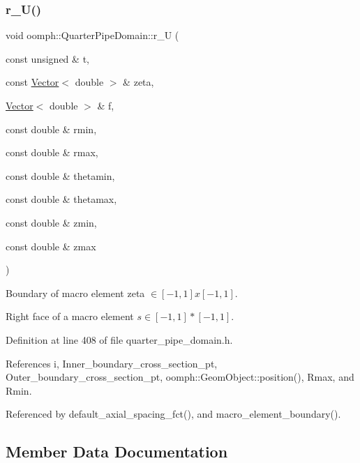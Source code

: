 \subsubsection{\texorpdfstring{r\+\_\+\+U()}{r\_U()}}
{\footnotesize\ttfamily void oomph\+::\+Quarter\+Pipe\+Domain\+::r\+\_\+U (\begin{DoxyParamCaption}\item[{const unsigned \&}]{t,  }\item[{const \hyperlink{classoomph_1_1Vector}{Vector}$<$ double $>$ \&}]{zeta,  }\item[{\hyperlink{classoomph_1_1Vector}{Vector}$<$ double $>$ \&}]{f,  }\item[{const double \&}]{rmin,  }\item[{const double \&}]{rmax,  }\item[{const double \&}]{thetamin,  }\item[{const double \&}]{thetamax,  }\item[{const double \&}]{zmin,  }\item[{const double \&}]{zmax }\end{DoxyParamCaption})\hspace{0.3cm}{\ttfamily [private]}}



Boundary of macro element zeta $ \in [-1,1]x[-1,1] $. 

Right face of a macro element $ s \in [-1,1]*[-1,1] $. 

Definition at line 408 of file quarter\+\_\+pipe\+\_\+domain.\+h.



References i, Inner\+\_\+boundary\+\_\+cross\+\_\+section\+\_\+pt, Outer\+\_\+boundary\+\_\+cross\+\_\+section\+\_\+pt, oomph\+::\+Geom\+Object\+::position(), Rmax, and Rmin.



Referenced by default\+\_\+axial\+\_\+spacing\+\_\+fct(), and macro\+\_\+element\+\_\+boundary().



\subsection{Member Data Documentation}
\mbox{\label{classoomph_1_1QuarterPipeDomain_ada15e8a576d3715e8ed88ea9bef5508a}} 
